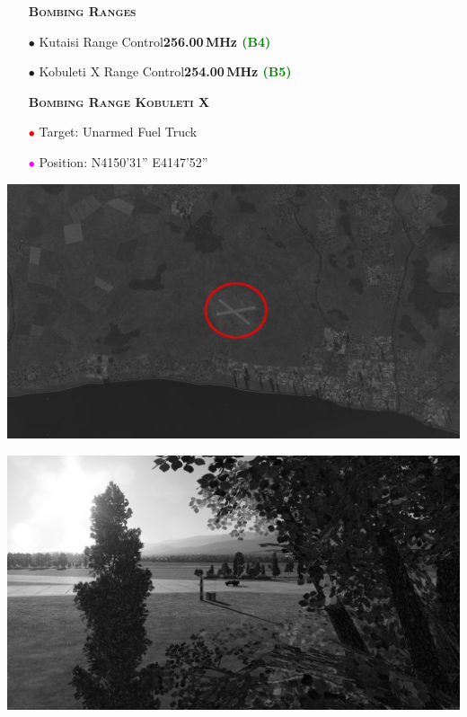 \documentclass[a4paper,12pt,dvipsnames]{letter}
\newcommand{\grun}[1]{\textcolor{Green}{#1}}
\newcommand{\button}[1]{\textbf{#1}}
\newcommand{\Deg}{\textdegree{}}
\newcommand{\DMS}[3]{#1\Deg#2'#3''}
\newcommand{\myHead}[1]{{\LARGE\textsc{\textbf{#1}}}}
\newcommand{\myhead}[1]{{\large\textsc{\textbf{#1}}}}
\newcommand{\bi}{\textcolor{ProcessBlue}{$\bullet$\;}}
\newcommand{\ri}{\textcolor{Red}{$\bullet$\;}}
\newcommand{\gi}{\textcolor{Green}{$\bullet$\;}}
\newcommand{\mi}{\textcolor{Magenta}{$\bullet$\;}}
\begin{document}
{\begin{itemize}
\begin{itemize}
  \item[\gi] TACAN\dotfill\button{3Y (SHL)}
 \end{itemize}
Note that Arco and Shell change shifts whenever either one\\runs out of fuel.\\
 \vspace{0.5em}
 \item[] \myhead{Bombing Ranges}
 \item[\bi] Kutaisi Range Control\dotfill\button{256.00\,MHz \grun{(B4)}}
 \item[\bi] Kobuleti X Range Control\dotfill\button{254.00\,MHz \grun{(B5)}}
\end{itemize}
\newpage
\begin{itemize}
 \item[] \myHead{Bombing Range Kobuleti X}
 \item[\ri] Target: Unarmed Fuel Truck
 \item[\mi] Position: N\DMS{41}{50}{31} E\DMS{41}{47}{52}
\end{itemize}
\begin{center}
\includegraphics[width=0.7\linewidth]{../_kneeboard/Range_Kobuleti_Sat.png}
\end{center}
\vspace*{1em}
\begin{center}
\includegraphics[width=0.7\linewidth]{../_kneeboard/Range_Kobuleti_Pic1.png}

\end{center}}
\end{document}
